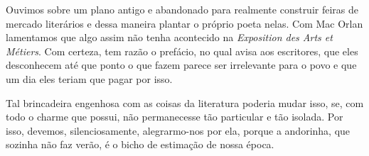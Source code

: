 Ouvimos sobre um plano antigo e abandonado para realmente construir
feiras de mercado literários e dessa maneira plantar o próprio poeta
nelas. Com Mac Orlan lamentamos que algo assim não tenha acontecido na
\emph{Exposition des Arts et Métiers}. Com certeza, tem razão o
prefácio, no qual avisa aos escritores, que eles desconhecem até que
ponto o que fazem parece ser irrelevante para o povo e que um dia eles
teriam que pagar por isso.

Tal brincadeira engenhosa com as coisas da literatura poderia mudar
isso, se, com todo o charme que possui, não permanecesse tão particular
e tão isolada. Por isso, devemos, silenciosamente, alegrarmo-nos por
ela, porque a andorinha, que sozinha não faz verão, é o bicho de
estimação de nossa época.
